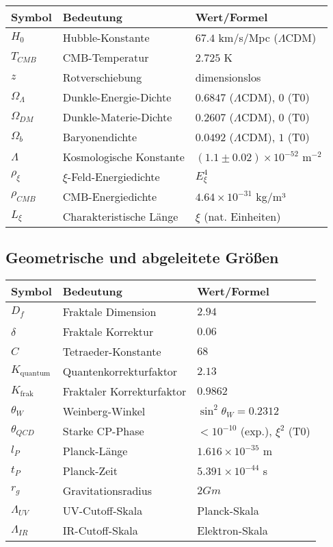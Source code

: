 \documentclass[12pt,a4paper]{article}
\begin{document}
	\begin{longtable}{lll}
		\toprule
		\textbf{Symbol} & \textbf{Bedeutung} & \textbf{Wert/Formel} \\
		\midrule
		$H_0$ & Hubble-Konstante & $67.4$ km/s/Mpc ($\Lambda$CDM) \\
		$T_{CMB}$ & CMB-Temperatur & $2.725$ K \\
		$z$ & Rotverschiebung & dimensionslos \\
		$\Omega_\Lambda$ & Dunkle-Energie-Dichte & $0.6847$ ($\Lambda$CDM), $0$ (T0) \\
		$\Omega_{DM}$ & Dunkle-Materie-Dichte & $0.2607$ ($\Lambda$CDM), $0$ (T0) \\
		$\Omega_b$ & Baryonendichte & $0.0492$ ($\Lambda$CDM), $1$ (T0) \\
		$\Lambda$ & Kosmologische Konstante & $(1.1 \pm 0.02) \times 10^{-52}$ m$^{-2}$ \\
		$\rho_\xi$ & $\xi$-Feld-Energiedichte & $E_\xi^4$ \\
		$\rho_{CMB}$ & CMB-Energiedichte & $4.64 \times 10^{-31}$ kg/m³ \\
		$L_\xi$ & Charakteristische Länge & $\xi$ (nat. Einheiten) \\
		\bottomrule
	\end{longtable}
	
	\subsection{Geometrische und abgeleitete Größen}
	
	\begin{longtable}{lll}
		\toprule
		\textbf{Symbol} & \textbf{Bedeutung} & \textbf{Wert/Formel} \\
		\midrule
		$D_f$ & Fraktale Dimension & $2.94$ \\
		$\delta$ & Fraktale Korrektur & $0.06$ \\
		$C$ & Tetraeder-Konstante & $68$ \\
		$K_{\text{quantum}}$ & Quantenkorrekturfaktor & $2.13$ \\
		$K_{\text{frak}}$ & Fraktaler Korrekturfaktor & $0.9862$ \\
		$\theta_W$ & Weinberg-Winkel & $\sin^2\theta_W = 0.2312$ \\
		$\theta_{QCD}$ & Starke CP-Phase & $< 10^{-10}$ (exp.), $\xi^2$ (T0) \\
		$l_P$ & Planck-Länge & $1.616 \times 10^{-35}$ m \\
		$t_P$ & Planck-Zeit & $5.391 \times 10^{-44}$ s \\
		$r_g$ & Gravitationsradius & $2Gm$ \\
		$\Lambda_{UV}$ & UV-Cutoff-Skala & Planck-Skala \\
		$\Lambda_{IR}$ & IR-Cutoff-Skala & Elektron-Skala \\
		\bottomrule
	\end{longtable}
	
\end{document}
